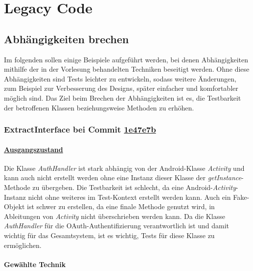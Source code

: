 \chapter{Legacy Code}
\label{ch:Legacy_Code}

\section{Abhängigkeiten brechen}

Im folgenden sollen einige Beispiele aufgeführt werden, bei denen Abhängigkeiten mithilfe der in der Vorlesung behandelten Techniken beseitigt werden.
Ohne diese Abhängigkeiten sind Tests leichter zu entwickeln, sodass weitere Änderungen, zum Beispiel zur Verbesserung des Designs, später einfacher und komfortabler möglich sind.
Das Ziel beim Brechen der Abhängigkeiten ist es, die Testbarkeit der betroffenen Klassen beziehungsweise Methoden zu erhöhen.

\newpage

\subsection{ExtractInterface bei Commit \href{https://github.com/lukaspanni/OpenSourceStats/commit/1e47e7b2d42c04429a433a6ac3dbea781409d36d} {1e47e7b}}
\label{sec:ExtractInterface_AuthHandler_1}

\subsubsection*{\href{https://github.com/lukaspanni/OpenSourceStats/tree/0daf8862a81a976e3d6341f5b5461bc8d3c64b4f/app/src/main/java/de/lukaspanni/opensourcestats/auth/}{Ausgangszustand}}

Die Klasse \textit{AuthHandler} ist stark abhängig von der Android-Klasse \textit{Activity} und kann auch nicht erstellt werden ohne eine Instanz dieser Klasse der \textit{getInstance}-Methode zu übergeben.
Die Testbarkeit ist schlecht, da eine Android-\textit{Activity}-Instanz nicht ohne weiteres im Test-Kontext erstellt werden kann.
Auch ein Fake-Objekt ist schwer zu erstellen, da eine finale Methode genutzt wird, in Ableitungen von \textit{Activity} nicht überschrieben werden kann.
Da die Klasse \textit{AuthHandler} für die OAuth-Authentifizierung verantwortlich ist und damit wichtig für das Gesamtsystem, ist es wichtig, Tests für diese Klasse zu ermöglichen.

\subsubsection*{Gewählte Technik}

